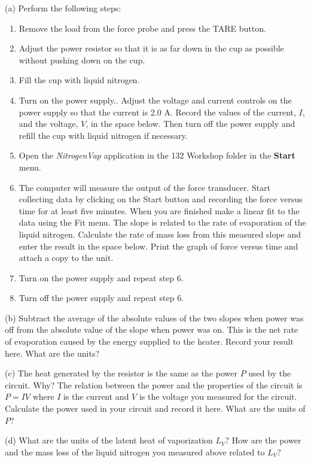 (a) Perform the following steps:

\begin{enumerate}
\item Remove the load from the force probe and press the TARE button.
\item Adjust the power resistor so that it is as far down in the cup as
possible without pushing down on the cup.
\item Fill the cup with liquid nitrogen.
\item Turn on the power supply.. Adjust the voltage and
current controls on the power supply so that the current is
2.0 A. Record the values of the current, $I$, and the voltage, $V$,
in the space below. Then turn off the power supply and refill the
cup with liquid nitrogen if necessary.\answerspace{1in}

\item Open the \textit{NitrogenVap} application in the 132 Workshop folder
in the {\bf Start} menu.
\item The computer will measure the output of the force transducer. 
Start collecting data by clicking on the Start button and
recording the force versus time for at least five minutes. When you
are finished make a linear fit to the data using the Fit menu. The
slope is related to the rate of evaporation of the liquid nitrogen.
Calculate the rate of mass loss from this measured slope and enter
the result in the space below. Print the graph of force versus time
and attach a copy to the unit. \answerspace{0.75in}

\item Turn on the power supply and repeat step 6.
\item Turn off the power supply and repeat step 6.
\end{enumerate}
(b) Subtract the average of the absolute values of the two slopes
when power was off from the absolute value of the slope when power
was on. This is the net rate of evaporation caused by the energy supplied
to the heater. Record your result here. What are the units?
\answerspace{20mm}

(c) The heat generated by the resistor is the same as the power $P$ used by the circuit. Why?
The relation between the power and the properties of the circuit is $P= IV$ where
$I$ is the current and $V$ is the voltage you measured for the circuit.
Calculate the power used in your circuit and record it here.
What are the units of $P$?
\answerspace{20mm}

(d) What are the units of the latent heat of vaporization $L_V$?
How are  the power and the mass loss of the liquid nitrogen you 
measured above related to $L_V$?
\answerspace{20mm}

